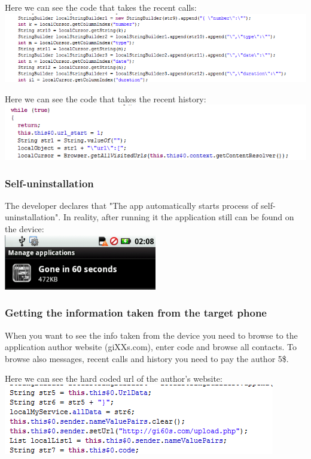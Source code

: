 \parbox{\textwidth}{
Here we can see the code that takes the recent calls: \\
\includegraphics[width=\textwidth]{figs/gone60_9.png}
}

\parbox{\textwidth}{
Here we can see the code that takes the recent history: \\
\includegraphics[width=\textwidth]{figs/gone60_10.png}
}

\subsubsection{Self-uninstallation}
\parbox{\textwidth}{
The developer declares that "The app automatically starts process of self-uninstallation". In reality, after running it the application still can be found on the device: \\
\includegraphics[width=0.5\textwidth]{figs/gone60_11.png}
}

\subsubsection{Getting the information taken from the target phone}
When you want to see the info taken from the device you need to browse to the application author website (giXXs.com), enter code and browse all contacts. To browse also messages, recent calls and history you need to pay the author 5\$.

\parbox{\textwidth}{
Here we can see the hard coded url of the author's website: \\
\includegraphics[width=\textwidth]{figs/gone60_12.png}
}


